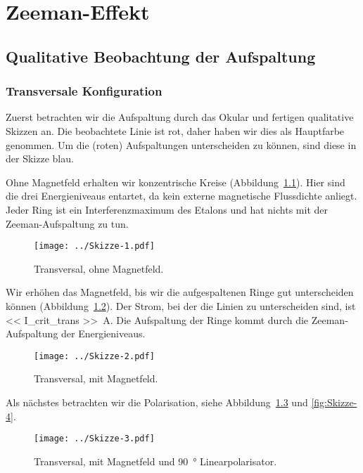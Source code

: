 \chapter{Zeeman-Effekt}

\section{Qualitative Beobachtung der Aufspaltung}

\subsection{Transversale Konfiguration}

Zuerst betrachten wir die Aufspaltung durch das Okular und fertigen qualitative
Skizzen an. Die beobachtete Linie ist rot, daher haben wir dies als Hauptfarbe
genommen. Um die (roten) Aufspaltungen unterscheiden zu können, sind diese in
der Skizze blau.

Ohne Magnetfeld erhalten wir konzentrische Kreise
(Abbildung~\ref{fig:Skizze-1}). Hier sind die drei Energieniveaus entartet, da
kein externe magnetische Flussdichte anliegt. Jeder Ring ist ein
Interferenzmaximum des Etalons und hat nichts mit der Zeeman-Aufspaltung zu
tun.

\begin{figure}[htbp]
    \centering
    \texttt{[image: ../Skizze-1.pdf]}
    \caption{%
        Transversal, ohne Magnetfeld.
    }
    \label{fig:Skizze-1}
\end{figure}

Wir erhöhen das Magnetfeld, bis wir die aufgespaltenen Ringe gut unterscheiden
können (Abbildung~\ref{fig:Skizze-2}). Der Strom, bei der die Linien zu
unterscheiden sind, ist \SI{<< I_crit_trans >>}{\ampere}. Die Aufspaltung der
Ringe kommt durch die Zeeman-Aufspaltung der Energieniveaus. 

\begin{figure}[htbp]
    \centering
    \texttt{[image: ../Skizze-2.pdf]}
    \caption{%
        Transversal, mit Magnetfeld.
    }
    \label{fig:Skizze-2}
\end{figure}

Als nächstes betrachten wir die Polarisation, siehe
Abbildung~\ref{fig:Skizze-3} und \ref{fig:Skizze-4}.

\begin{figure}[htbp]
    \centering
    \texttt{[image: ../Skizze-3.pdf]}
    \caption{%
        Transversal, mit Magnetfeld und \SI{90}{\degree} Linearpolarisator.
    }
    \label{fig:Skizze-3}
\end{figure}

